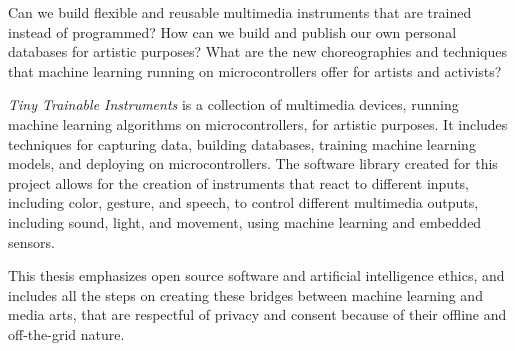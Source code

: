 % 
%
%
Can we build flexible and reusable multimedia instruments that are trained instead of programmed? How can we build and publish our own personal databases for artistic purposes? What are the new choreographies and techniques that machine learning running on microcontrollers offer for artists and activists?

 \emph{Tiny Trainable Instruments} is a collection of multimedia devices, running machine learning algorithms on microcontrollers, for artistic purposes. It includes techniques for capturing data, building databases, training machine learning models, and deploying on microcontrollers. The software library created for this project allows for the creation of instruments that react to different inputs, including color, gesture, and speech, to control different multimedia outputs, including sound, light, and movement, using machine learning and embedded sensors.

This thesis emphasizes open source software and artificial intelligence ethics, and includes all the steps on creating these bridges between machine learning and media arts, that are respectful of privacy and consent because of their offline and off-the-grid nature.
